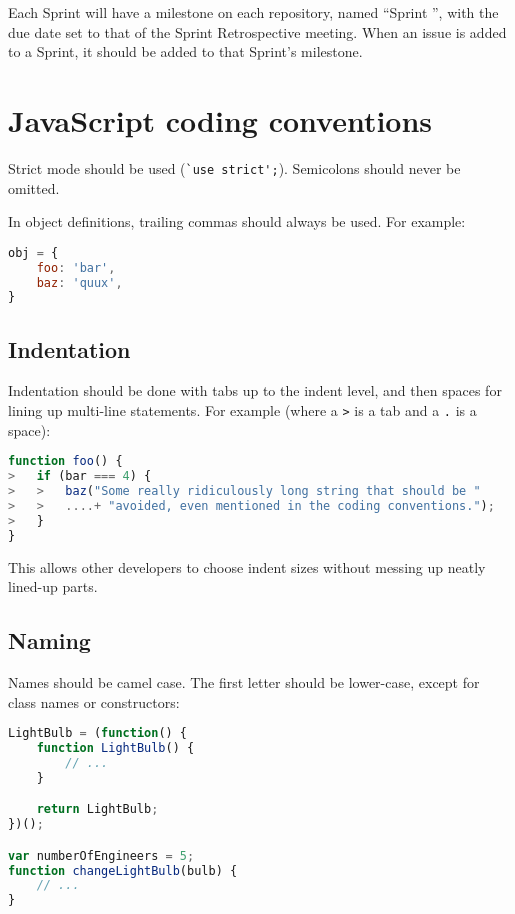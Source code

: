 Each Sprint will have a milestone on each repository, named ``Sprint '',
with the due date set to that of the Sprint Retrospective meeting. When
an issue is added to a Sprint, it should be added to that Sprint's
milestone.

\section{JavaScript coding
conventions}

Strict mode should be used (\lstinline|`use strict';|). Semicolons should
never be omitted.

In object definitions, trailing commas should always be used. For
example:

\begin{lstlisting}[language=javascript]
obj = {
    foo: 'bar',
    baz: 'quux',
}
\end{lstlisting}

\subsection{Indentation}

Indentation should be done with tabs up to the indent level, and then
spaces for lining up multi-line statements. For example (where a
\texttt{\textgreater{}} is a tab and a \texttt{.} is a space):

\begin{lstlisting}[language=javascript]
function foo() {
>   if (bar === 4) {
>   >   baz("Some really ridiculously long string that should be "
>   >   ....+ "avoided, even mentioned in the coding conventions.");
>   }
}
\end{lstlisting}

This allows other developers to choose indent sizes without messing up
neatly lined-up parts.

\subsection{Naming}

Names should be camel case. The first letter should be lower-case,
except for class names or constructors:

\begin{lstlisting}[language=javascript]
LightBulb = (function() {
    function LightBulb() {
        // ...
    }

    return LightBulb;
})();

var numberOfEngineers = 5;
function changeLightBulb(bulb) {
    // ...
}
\end{lstlisting}

